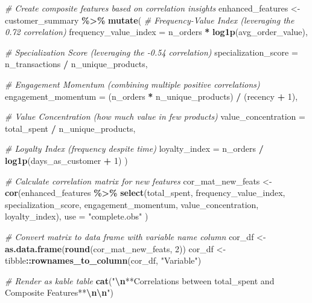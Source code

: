 \documentclass[
]{article}
\newenvironment{Shaded}{\begin{snugshade}}{\end{snugshade}}
\newcommand{\AttributeTok}[1]{\textcolor[rgb]{0.13,0.29,0.53}{#1}}
\newcommand{\CommentTok}[1]{\textcolor[rgb]{0.56,0.35,0.01}{\textit{#1}}}
\newcommand{\DecValTok}[1]{\textcolor[rgb]{0.00,0.00,0.81}{#1}}
\newcommand{\FunctionTok}[1]{\textcolor[rgb]{0.13,0.29,0.53}{\textbf{#1}}}
\newcommand{\NormalTok}[1]{#1}
\newcommand{\OtherTok}[1]{\textcolor[rgb]{0.56,0.35,0.01}{#1}}
\newcommand{\SpecialCharTok}[1]{\textcolor[rgb]{0.81,0.36,0.00}{\textbf{#1}}}
\newcommand{\StringTok}[1]{\textcolor[rgb]{0.31,0.60,0.02}{#1}}
\begin{document}
\begin{Shaded}
\begin{Highlighting}[]
\CommentTok{\# Create composite features based on correlation insights}
\NormalTok{enhanced\_features }\OtherTok{\textless{}{-}}\NormalTok{ customer\_summary }\SpecialCharTok{\%\textgreater{}\%}
  \FunctionTok{mutate}\NormalTok{(}
    \CommentTok{\# Frequency{-}Value Index (leveraging the 0.72 correlation)}
    \AttributeTok{frequency\_value\_index =}\NormalTok{ n\_orders }\SpecialCharTok{*} \FunctionTok{log1p}\NormalTok{(avg\_order\_value),}
    
    \CommentTok{\# Specialization Score (leveraging the {-}0.54 correlation)}
    \AttributeTok{specialization\_score =}\NormalTok{ n\_transactions }\SpecialCharTok{/}\NormalTok{ n\_unique\_products,}
    
    \CommentTok{\# Engagement Momentum (combining multiple positive correlations)}
    \AttributeTok{engagement\_momentum =}\NormalTok{ (n\_orders }\SpecialCharTok{*}\NormalTok{ n\_unique\_products) }\SpecialCharTok{/}\NormalTok{ (recency }\SpecialCharTok{+} \DecValTok{1}\NormalTok{),}
    
    \CommentTok{\# Value Concentration (how much value in few products)}
    \AttributeTok{value\_concentration =}\NormalTok{ total\_spent }\SpecialCharTok{/}\NormalTok{ n\_unique\_products,}
    
    \CommentTok{\# Loyalty Index (frequency despite time)}
    \AttributeTok{loyalty\_index =}\NormalTok{ n\_orders }\SpecialCharTok{/} \FunctionTok{log1p}\NormalTok{(days\_as\_customer }\SpecialCharTok{+} \DecValTok{1}\NormalTok{)}
\NormalTok{  )}

\CommentTok{\# Calculate correlation matrix for new features}
\NormalTok{cor\_mat\_new\_feats }\OtherTok{\textless{}{-}} \FunctionTok{cor}\NormalTok{(enhanced\_features }\SpecialCharTok{\%\textgreater{}\%} 
    \FunctionTok{select}\NormalTok{(total\_spent, frequency\_value\_index, specialization\_score, }
\NormalTok{           engagement\_momentum, value\_concentration, loyalty\_index),}
    \AttributeTok{use =} \StringTok{"complete.obs"}
\NormalTok{  )}

\CommentTok{\# Convert matrix to data frame with variable name column}
\NormalTok{cor\_df }\OtherTok{\textless{}{-}} \FunctionTok{as.data.frame}\NormalTok{(}\FunctionTok{round}\NormalTok{(cor\_mat\_new\_feats, }\DecValTok{2}\NormalTok{))}
\NormalTok{cor\_df }\OtherTok{\textless{}{-}}\NormalTok{ tibble}\SpecialCharTok{::}\FunctionTok{rownames\_to\_column}\NormalTok{(cor\_df, }\StringTok{"Variable"}\NormalTok{)}

\CommentTok{\# Render as kable table}
\FunctionTok{cat}\NormalTok{(}\StringTok{"}\SpecialCharTok{\textbackslash{}n}\StringTok{**Correlations between total\_spent and Composite Features**}\SpecialCharTok{\textbackslash{}n\textbackslash{}n}\StringTok{"}\NormalTok{)}
\end{Highlighting}
\end{Shaded}
\end{document}
